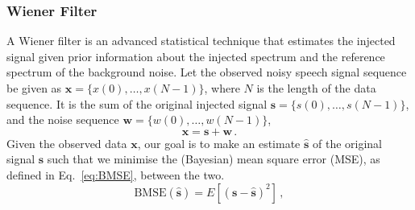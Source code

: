 \documentclass[paper-main.tex]{subfiles}
\begin{document}
\subsubsection{Wiener Filter}

A Wiener filter is an advanced statistical technique that estimates the injected signal given prior information about the injected spectrum and the reference spectrum of the background noise. Let the observed noisy speech signal sequence be given as $\mathbf{x}=\{x(0),\dots, x(N-1)\}$, where $N$ is the length of the data sequence. It is the sum of the original injected signal $\mathbf{s}=\{s(0),\dots,s(N-1)\}$, and the noise sequence $\mathbf{w}=\{w(0),\dots,w(N-1)\}$, 
\begin{equation}
    \mathbf{x}=\mathbf{s}+\mathbf{w}\,.
\end{equation}
Given the observed data $\textbf{x}$, our goal is to make an estimate $\hat{\textbf{s}}$ of the original signal $\textbf{s}$ such that we minimise the (Bayesian) mean square error (MSE), as defined in Eq.~\ref{eq:BMSE}, between the two.
\begin{equation}
\label{eq:BMSE}
\text{BMSE}(\hat{\textbf{s}})=E[(\textbf{s}-\hat{\textbf{s}})^2]\,,
\end{equation}
\end{document}
